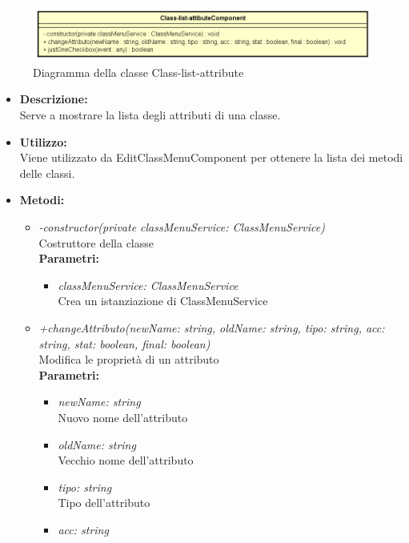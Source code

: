 \begin{figure}[h!]
	\centering
	\includegraphics[scale=0.8]{res/sections/SpecificaFrontEnd/Components/Disegnetti/class-list-attribute.png}
	\caption{Diagramma della classe Class-list-attribute}
\end{figure}

\begin{itemize}
	\item \textbf{Descrizione:}\\
	Serve a mostrare la lista degli attributi di una classe.
	\item \textbf{Utilizzo:}\\
	Viene utilizzato da EditClassMenuComponent per ottenere la lista dei metodi delle classi.
	\item \textbf{Metodi:}
		\begin{itemize}
			\item \emph{-constructor(private classMenuService: ClassMenuService)}\\
    		Costruttore della classe\\
    		\textbf{Parametri:}
    		\begin{itemize}
    			\item \emph{classMenuService: ClassMenuService}\\
    			Crea un istanziazione di ClassMenuService
    		\end{itemize}
    		\item \emph{+changeAttributo(newName: string, oldName: string, tipo: string, acc: string, stat: boolean, final: boolean)}\\
    		Modifica le proprietà di un attributo\\
    		\textbf{Parametri:}
    		\begin{itemize}
    			\item \emph{newName: string}\\
    			Nuovo nome dell'attributo
    			\item \emph{oldName: string}\\
    			Vecchio nome dell'attributo
    			\item \emph{tipo: string}\\
    			Tipo dell'attributo
    			\item \emph{acc: string}\\

\end{itemize}
\end{itemize}
\end{itemize}
